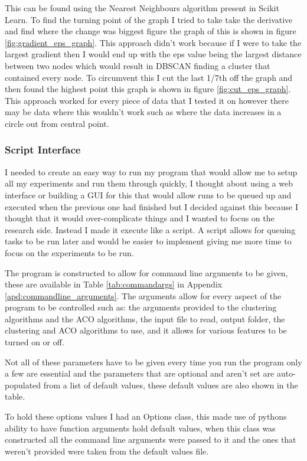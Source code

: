 This can be found using the Nearest Neighbours algorithm present in Scikit Learn\cite{scikit_learn_nearest_neighbours}. To find the turning point of the graph I tried to take take the derivative and find where the change was biggest figure the graph of this is shown in figure \ref{fig:gradient_eps_graph}. This approach didn't work because if I were to take the largest gradient then I would end up with the eps value being the largest distance between two nodes which would result in DBSCAN finding a cluster that contained every node. To circumvent this I cut the last 1/7th off the graph and then found the highest point this graph is shown in figure \ref{fig:cut_eps_graph}. This approach worked for every piece of data that I tested it on however there may be data where this wouldn't work such as where the data increases in a circle out from central point.

\subsubsection{Script Interface}

I needed to create an easy way to run my program that would allow me to setup all my experiments and run them through quickly, I thought about using a web interface or building a GUI for this that would allow runs to be queued up and executed when the previous one had finished but I decided against this because I thought that it would over-complicate things and I wanted to focus on the research side. Instead I made it execute like a script. A script allows for queuing tasks to be run later and would be easier to implement giving me more time to focus on the experiments to be run.

The program is constructed to allow for command line arguments to be given, these are available in Table \ref{tab:commandargs} in Appendix \ref{apd:commandline_arguments}. The arguments allow for every aspect of the program to be controlled such as: the arguments provided to the clustering algorithms and the ACO algorithms, the input file to read, output folder, the clustering and ACO algorithms to use, and it allows for various features to be turned on or off. 

Not all of these parameters have to be given every time you run the program only a few are essential and the parameters that are optional and aren't set are auto-populated from a list of default values, these default values are also shown in the table.

To hold these options values I had an Options class, this made use of pythons ability to have function arguments hold default values, when this class was constructed all the command line arguments were passed to it and the ones that weren't provided were taken from the default values file.

